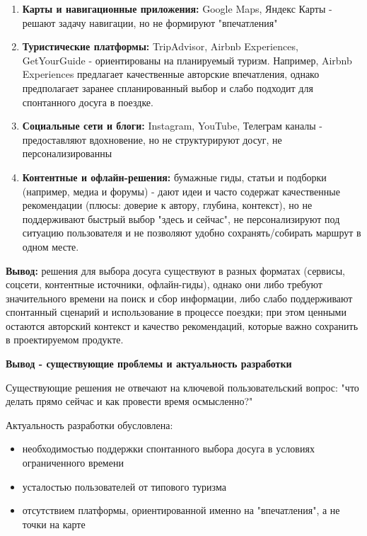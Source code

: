 \documentclass[a4paper]{article}
\begin{document}
\begin{description}
    \begin{enumerate}[label=\textbf{\arabic*.}]
        \item \textbf{Карты и навигационные приложения:} Google Maps, Яндекс Карты - решают задачу навигации, но не формируют "впечатления"
        \item \textbf{Туристические платформы:} TripAdvisor, Airbnb Experiences, GetYourGuide - ориентированы на планируемый туризм. Например, Airbnb Experiences предлагает качественные авторские впечатления, однако предполагает заранее спланированный выбор и слабо подходит для спонтанного досуга в поездке.
        \item \textbf{Социальные сети и блоги:} Instagram, YouTube, Телеграм каналы - предоставляют вдохновение, но не структурируют досуг, не персонализированны
        \item \textbf{Контентные и офлайн-решения:} бумажные гиды, статьи и подборки (например, медиа и форумы) - дают идеи и часто содержат качественные рекомендации (плюсы: доверие к автору, глубина, контекст), но не поддерживают быстрый выбор "здесь и сейчас", не персонализируют под ситуацию пользователя и не позволяют удобно сохранять/собирать маршрут в одном месте.
    \end{enumerate}

    \textbf{Вывод:} решения для выбора досуга существуют в разных форматах (сервисы, соцсети, контентные источники, офлайн-гиды), однако они либо требуют значительного времени на поиск и сбор информации, либо слабо поддерживают спонтанный сценарий и использование в процессе поездки; при этом ценными остаются авторский контекст и качество рекомендаций, которые важно сохранить в проектируемом продукте.

    \item[\large1.5] \large \textbf{Вывод - существующие проблемы и актуальность разработки}
    
    \normalsize Существующие решения не отвечают на ключевой пользовательский вопрос: "что делать прямо сейчас и как провести время осмысленно?"

    Актуальность разработки обусловлена:
    \begin{itemize}[label=$-$]
        \item необходимостью поддержки спонтанного выбора досуга в условиях ограниченного времени
        \item усталостью пользователей от типового туризма
        \item отсутствием платформы, ориентированной именно на "впечатления", а не точки на карте
    \end{itemize}


\end{description}
\end{document}
